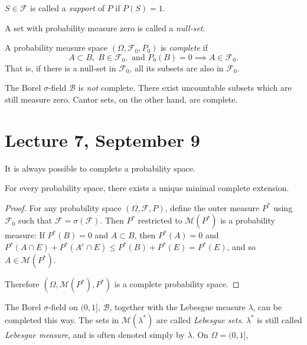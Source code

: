 \documentclass[11pt,fleqn]{book} %
\begin{document}
\begin{definition}[Support] \label{def:support}
	$S \in \mathcal{F}$ is called a \emph{support} of $P$ if $P(S)=1$.
\end{definition}

\begin{definition} \label{def:null-set}
	A set with probability measure zero is called a \emph{null-set}.
\end{definition}

\begin{definition}[Completeness] \label{def:completeness}
	A probability measure space $(\Omega,\mathcal{F}_0,P_0)$ is \emph{complete} if
	\[
		A \subset B, \; B \in \mathcal{F}_0, \textrm{ and } P_0(B) = 0 \implies A \in \mathcal{F}_0.
	\]
	That is, if there is a null-set in $\mathcal{F}_0$, all its subsets are also in $\mathcal{F}_0$.
\end{definition}

The Borel $\sigma$-field $\mathcal{B}$ is \emph{not} complete. There exist uncountable subsets which are still measure zero. Cantor sets, on the other hand, are complete.

\section{Lecture 7, September 9}

It is always possible to complete a probability space.

\begin{theorem} \label{thm:complete-extension}
	For every probability space, there exists a unique minimal complete extension.
\end{theorem}

\begin{proof}
	For any probability space $(\Omega,\mathcal{F},P)$, define the outer measure $P^*$ using $\mathcal{F}_0$ such that $\mathcal{F} = \sigma(\mathcal{F})$. Then $P^*$ restricted to $\mathcal{M}(P^*)$ is a probability measure: If $P^*(B) = 0$ and $A \subset B$, then $P^*(A)=0$ and $P^*(A \cap E) + P^*(A^c \cap E) \leq P^*(B) + P^*(E) = P^*(E)$, and so $A \in \mathcal{M}(P^*)$.

	Therefore $(\Omega,\mathcal{M}(P^*),P^*)$ is a complete probability space.
\end{proof}

The Borel $\sigma$-field on $(0,1]$, $\mathcal{B}$, together with the Lebesgue measure $\lambda$, can be completed this way. The sets in $\mathcal{M}(\lambda^*)$ are called \emph{Lebesgue sets}. $\lambda^*$ is still called \emph{Lebesgue measure}, and is often denoted simply by $\lambda$. On $\Omega = (0,1]$,
\end{document}
